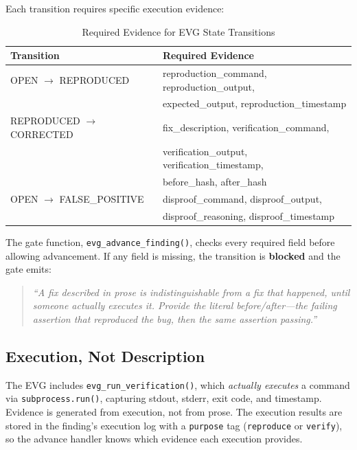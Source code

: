 \documentclass[11pt,a4paper]{article}
\begin{document}
Each transition requires specific execution evidence:

\begin{table}[H]
\centering
\caption{Required Evidence for EVG State Transitions}
\small
\begin{tabular}{@{}ll@{}}
\toprule
\textbf{Transition} & \textbf{Required Evidence} \\
\midrule
OPEN $\rightarrow$ REPRODUCED & reproduction\_command, reproduction\_output, \\
& expected\_output, reproduction\_timestamp \\
\addlinespace
REPRODUCED $\rightarrow$ CORRECTED & fix\_description, verification\_command, \\
& verification\_output, verification\_timestamp, \\
& before\_hash, after\_hash \\
\addlinespace
OPEN $\rightarrow$ FALSE\_POSITIVE & disproof\_command, disproof\_output, \\
& disproof\_reasoning, disproof\_timestamp \\
\bottomrule
\end{tabular}
\end{table}

The gate function, \texttt{evg\_advance\_finding()}, checks every required field before allowing advancement. If any field is missing, the transition is \textbf{blocked} and the gate emits:

\begin{quote}
\small
\textit{``A fix described in prose is indistinguishable from a fix that happened, until someone actually executes it. Provide the literal before/after---the failing assertion that reproduced the bug, then the same assertion passing.''}
\end{quote}

\subsection{Execution, Not Description}

The EVG includes \texttt{evg\_run\_verification()}, which \textit{actually executes} a command via \texttt{subprocess.run()}, capturing stdout, stderr, exit code, and timestamp. Evidence is generated from execution, not from prose. The execution results are stored in the finding's execution log with a \texttt{purpose} tag (\texttt{reproduce} or \texttt{verify}), so the advance handler knows which evidence each execution provides.
\end{document}
